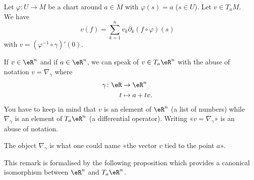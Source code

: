 \noproof

\begin{lemma}       \label{LEMooZXEFooZgXbNP}
	Let \( \varphi\colon U\to M\) be a chart around \( a\in M\) with \( \varphi(s)=a\) (\( s\in U\)). Let \( v\in T_aM\). We have
	\begin{equation}
		v(f)=\sum_{k=1}^nv_k\partial_k(f\circ \varphi)(s)
	\end{equation}
	with \( v= (\varphi^{-1}\circ \gamma)'(0)\).
\end{lemma}

\noproof

\begin{normaltext}      \label{NORMooXAJGooDNyxjv}
	If \( v\in \eR^n\) and if \( a\in \eR^n\), we can speak of \( v\in T_a\eR^n\) with the abuse of notation \( v=\nabla_{\gamma}\) where
	\begin{equation}
		\begin{aligned}
			\gamma\colon \eR & \to \eR^n     \\
			t                & \mapsto a+tv.
		\end{aligned}
	\end{equation}
	You have to keep in mind that \( v\) is an element of \( \eR^n\) (a list of numbers) while \( \nabla_{\gamma}\) is an element of \( T_a\eR^n\) (a differential operator). Writing «\( v=\nabla_{\gamma}\)» is an abuse of notation.

	The object \( \nabla_{\gamma}\) is what one could name «the vector \( v\) tied to the point \( a\)».
\end{normaltext}

This remark is formalised by the following proposition which provides a canonical isomorphism between \( \eR^n\) and \( T_a\eR^n\).

